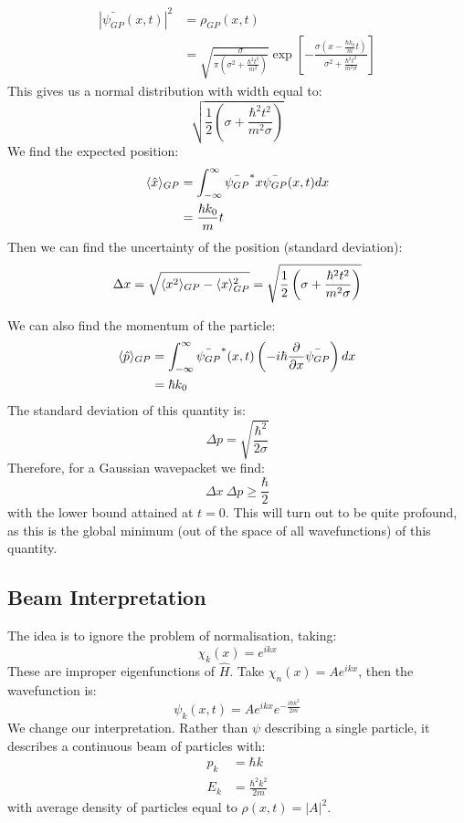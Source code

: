 \documentclass[../Main.tex]{subfiles}
\begin{document}
\begin{align*}
    |\bar{\psi_{GP}}(x, t)|^2 &= \rho_{GP}(x, t) \\
    &= \sqrt{\frac{\sigma}{\pi\left(\sigma^2 + \frac{\hbar^2 t^2}{m^2}\right)}} \exp\left[-\frac{\sigma(x - \frac{\hbar k_0}{m}t)}{\sigma^2 + \frac{\hbar^2 t^2}{m^2 \sigma}}\right]
\end{align*}
This gives us a normal distribution with width equal to:
\begin{equation*}
    \sqrt{\frac12 \left(\sigma + \frac{\hbar^2 t^2}{m^2 \sigma}\right)}
\end{equation*}
We find the expected position:
\begin{align*}
    \langle \hat{x} \rangle_{GP} &= \int_{-\infty}^{\infty} \bar{\psi_{GP}}^* x \bar{\psi_{GP}}(x, t) dx \\
    &= \frac{\hbar k_0}{m}t
\end{align*}
Then we can find the uncertainty of the position (standard deviation):
\begin{equation*}
    \Delta x = \sqrt{\langle x^2 \rangle_{GP} - \langle x \rangle_{GP}^2} = \sqrt{\frac12 \left(\sigma + \frac{\hbar^2 t^2}{m^2 \sigma}\right)}
\end{equation*}

We can also find the momentum of the particle:
\begin{align*}
    \langle \hat{p} \rangle_{GP} &= \int_{-\infty}^{\infty} \bar{\psi_{GP}}^*(x, t) \left(-i \hbar \frac{\partial}{\partial x} \bar{\psi_{GP}}\right) dx \\
    &= \hbar k_0
\end{align*}
The standard deviation of this quantity is:
\begin{equation*}
    \Delta p = \sqrt{\frac{\hbar^2}{2\sigma}}
\end{equation*}
Therefore, for a Gaussian wavepacket we find:
\begin{equation*}
    \Delta x~\Delta p \geq \frac{\hbar}{2}
\end{equation*}
with the lower bound attained at $t = 0$. This will turn out to be quite profound, as this is the global minimum (out of the space of all wavefunctions) of this quantity.
\subsection{Beam Interpretation}
The idea is to ignore the problem of normalisation, taking:
\begin{equation*}
    \chi_k(x) = e^{ikx}
\end{equation*}
These are improper eigenfunctions of $\hat{H}$. Take $\chi_n(x) = Ae^{ikx}$, then the wavefunction is:
\begin{equation*}
    \psi_k(x, t) = Ae^{ikx} e^{-\frac{i\hbar k^2}{2m}}
\end{equation*}
We change our interpretation. Rather than $\psi$ describing a single particle, it describes a continuous beam of particles with:
\begin{align*}
    p_k &= \hbar k \\
    E_k &= \frac{\hbar^2 k^2}{2m}
\end{align*}
with average density of particles equal to $\rho(x, t) = |A|^2$.
\end{document}

